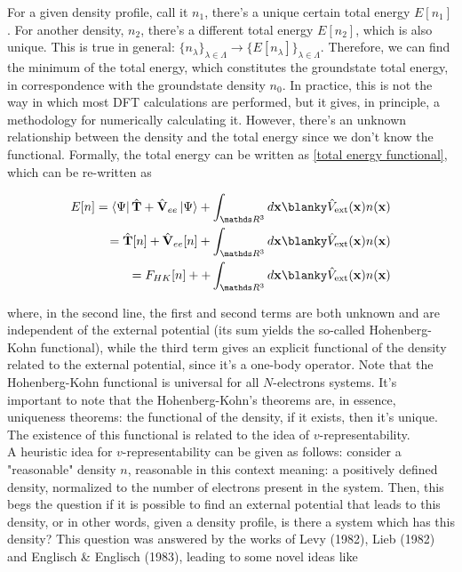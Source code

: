 \documentclass{homework}
\begin{document}
For a given density profile, call it $n_1$, there's a unique certain total energy $E[n_1]$. For another density, $n_2$, there's a different total energy $E[n_2]$, which is also unique. This is true in general: $\{n_\lambda\}_{\lambda \in \Lambda} \rightarrow \{E[n_\lambda]\}_{\lambda \in \Lambda}$. Therefore, we can find the minimum of the total energy, which constitutes the groundstate total energy, in correspondence with the groundstate density $n_0$. In practice, this is not the way in which most DFT calculations are performed, but it gives, in principle, a methodology for numerically calculating it. However, there's an unknown relationship between the density and the total energy since we don't know the functional. Formally, the total energy can be written as \eqref{total energy functional}, which can be re-written as 

\begin{align}
    E[n] = \bra{\Psi} \hat{\bf T}+\hat{\bf V}_{ee}\ket{\Psi} + \int_{\R^3} d{\bf x} \blanky \hat{V}_{\textnormal{ext}}({\bf x}) n({\bf x}) \\
    = \hat{\bf T}[n] + \hat{\bf V}_{ee}[n] + \int_{\R^3} d{\bf x} \blanky \hat{V}_{\textnormal{ext}}({\bf x}) n({\bf x}) \\
    = F_{HK}[n] + + \int_{\R^3} d{\bf x} \blanky \hat{V}_{\textnormal{ext}}({\bf x}) n({\bf x})
\end{align}

where, in the second line, the first and second terms are both unknown and are independent of the external potential (its sum yields the so-called Hohenberg-Kohn functional), while the third term gives an explicit functional of the density related to the external potential, since it's a one-body operator. Note that the Hohenberg-Kohn functional is universal for all $N$-electrons systems. It's important to note that the Hohenberg-Kohn's theorems are, in essence, uniqueness theorems: the functional of the density, if it exists, then it's unique. The existence of this functional is related to the idea of $v$-representability. \\

A heuristic idea for $v$-representability can be given as follows: consider a "reasonable" density $n$, reasonable in this context meaning: a positively defined density, normalized to the number of electrons present in the system. Then, this begs the question if it is possible to find an external potential that leads to this density, or in other words, given a density profile, is there a system which has this density?
This question was answered by the works of Levy (1982), Lieb (1982) and Englisch \& Englisch (1983), leading to some novel ideas like 
\end{document}
